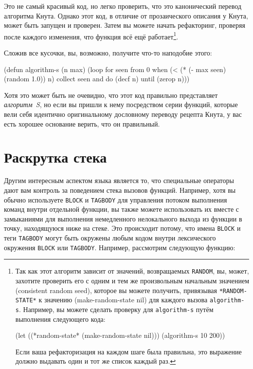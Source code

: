 Это не самый красивый код, но легко проверить, что это канонический перевод алгоритма
Кнута. Однако этот код, в отличие от прозаического описания у Кнута, может быть запущен и
проверен. Затем вы можете начать рефакторинг, проверяя после каждого изменения, что
функция всё ещё работает\footnote{Так как этот алгоритм зависит от значений, возвращаемых
  \lstinline{RANDOM}, вы, может, захотите проверить его с одним и тем же произвольным
  начальным значением (consistent random seed), которое вы можете получить, привязывая
  \lstinline{*RANDOM-STATE*} к значению (make-random-state nil) для каждого вызова
  \lstinline{algorithm-s}. Например, вы можете сделать проверку для
  \lstinline{algorithm-s} путём выполнения следующего кода:

\begin{myverb}
(let ((*random-state* (make-random-state nil))) (algorithm-s 10 200))
\end{myverb}

Если ваша рефакторизация на каждом шаге была правильна, это выражение должно выдавать один
и тот же список каждый раз.}.

Сложив все кусочки, вы, возможно, получите что-то наподобие этого:

\begin{myverb}
(defun algorithm-s (n max)
  (loop for seen from 0
     when (< (* (- max seen) (random 1.0)) n)
     collect seen and do (decf n)
     until (zerop n)))
\end{myverb}

Хотя это может быть не очевидно, что этот код правильно представляет \textit{алгоритм~S},
но если вы пришли к нему посредством серии функций, которые вели себя идентично
оригинальному дословному переводу рецепта Кнута, у вас есть хорошее основание верить, что
он правильный.

\section{Раскрутка стека}

Другим интересным аспектом языка является то, что специальные операторы дают вам контроль
за поведением стека вызовов функций. Например, хотя вы обычно используете
\lstinline{BLOCK} и \lstinline{TAGBODY} для управления потоком выполнения команд внутри
отдельной функции, вы также можете использовать их вместе с замыканиями для выполнения
немедленного нелокального выхода из функции в точку, находящуюся ниже на стеке. Это
происходит потому, что имена \lstinline{BLOCK} и теги \lstinline{TAGBODY} могут быть
окружены любым кодом внутри лексического окружения \lstinline{BLOCK} или
\lstinline{TAGBODY}.  Например, рассмотрим следующую функцию:

